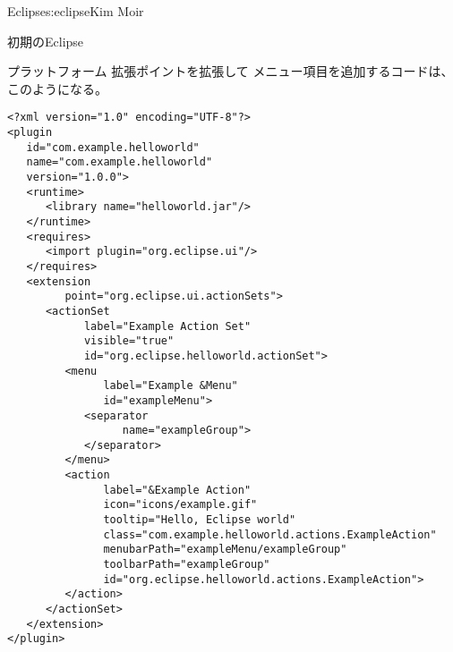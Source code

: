 \begin{aosachapter}{Eclipse}{s:eclipse}{Kim Moir}
\begin{aosasect1}{初期のEclipse}
\begin{aosasect2}{プラットフォーム}
拡張ポイントを拡張して
メニュー項目を追加するコードは、このようになる。

\begin{verbatim}
<?xml version="1.0" encoding="UTF-8"?>
<plugin
   id="com.example.helloworld"
   name="com.example.helloworld"
   version="1.0.0">
   <runtime>
      <library name="helloworld.jar"/>
   </runtime>
   <requires>
      <import plugin="org.eclipse.ui"/>
   </requires>
   <extension
         point="org.eclipse.ui.actionSets">
      <actionSet
            label="Example Action Set"
            visible="true"
            id="org.eclipse.helloworld.actionSet">
         <menu
               label="Example &Menu"
               id="exampleMenu">
            <separator
                  name="exampleGroup">
            </separator>
         </menu>
         <action
               label="&Example Action"
               icon="icons/example.gif"
               tooltip="Hello, Eclipse world"
               class="com.example.helloworld.actions.ExampleAction"
               menubarPath="exampleMenu/exampleGroup"
               toolbarPath="exampleGroup"
               id="org.eclipse.helloworld.actions.ExampleAction">
         </action>
      </actionSet>
   </extension>
</plugin>
\end{verbatim}


\end{aosasect2}
\end{aosasect1}
\end{aosachapter}

